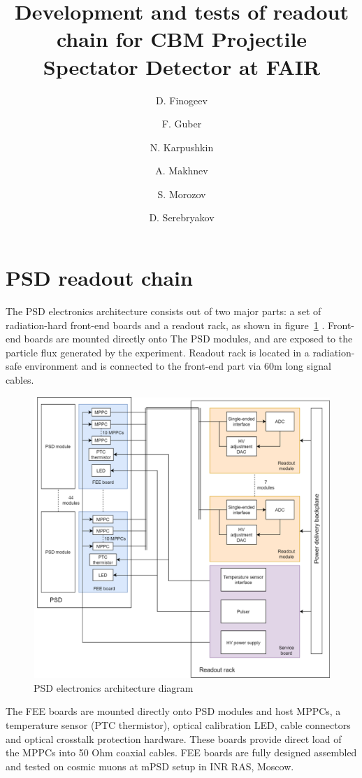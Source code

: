 \documentclass{CBM-PR-2020}
\begin{document}
\title{
Development and tests of readout chain for CBM Projectile Spectator Detector at FAIR
}

\author[a]{D. Finogeev}
\author[a,b]{F. Guber}
\author[a]{N. Karpushkin}
\author[a,b]{A. Makhnev}
\author[a,c]{S. Morozov}
\author[a]{D. Serebryakov}




\maketitle

\section{PSD readout chain}


The PSD electronics architecture consists out of two major parts: a set of radiation-hard front-end boards and a readout rack, as shown in figure~\ref{fig:1} \cite {1}. Front-end boards are mounted directly onto The PSD modules, and are exposed to the particle flux generated by the experiment. Readout rack is located in a radiation-safe environment and is connected to the front-end part via 60m long signal cables.

\begin{figure}[htbp]
	\centering
	\includegraphics[width=.4\textwidth]{FEE_scheme.png}
	\caption{\label{fig:1} PSD electronics architecture diagram}
\end{figure}

The FEE boards are mounted directly onto PSD modules and host MPPCs, a temperature sensor (PTC thermistor), optical calibration LED, cable connectors and optical crosstalk protection hardware. These boards provide direct load of the MPPCs into 50 Ohm coaxial cables. FEE boards are fully designed assembled and tested on cosmic muons at mPSD setup in INR RAS, Moscow.
\end{document}
